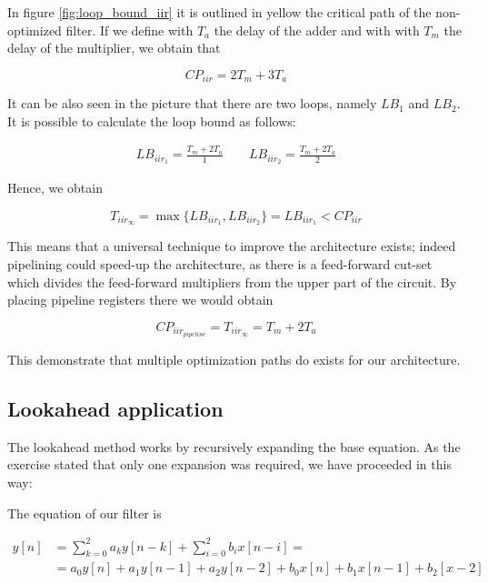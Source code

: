 In figure \ref{fig:loop_bound_iir} it is outlined in yellow the critical path of the non-optimized filter. If we define with
$T_{a}$ the delay of the adder and with with $T_{m}$ the delay of the multiplier, we obtain that

\begin{equation}
    \label{eq:baseline_iir_delay}
    CP_{iir} = 2T_{m} + 3T_{a}
\end{equation}

It can be also seen in the picture that there are two loops, namely $LB_{1}$ and $LB_{2}$. It is possible to calculate the
loop bound as follows:

\begin{align}\nonumber
    LB_{iir_{1}} = \frac{T_{m} + 2T_{a}}{1} \quad\quad LB_{iir_{2}} = \frac{T_{m} + 2T_{a}}{2}
\end{align}

Hence, we obtain

\begin{equation}\nonumber
    T_{iir_{\infty}} = \max \lbrace LB_{iir_{1}}, LB_{iir_{2}} \rbrace = LB_{iir_{1}} < CP_{iir}
\end{equation}

This means that a universal technique to improve the architecture exists; indeed pipelining could speed-up the architecture,
as there is a feed-forward cut-set which divides the feed-forward multipliers from the upper part of the circuit. By placing
pipeline registers there we would obtain

\begin{equation}
    CP_{iir_{pipeline}} = T_{iir_{\infty}} = T_{m} + 2T_{a}
\end{equation}

This demonstrate that multiple optimization paths do exists for our architecture.

\subsection{Lookahead application}

The lookahead method works by recursively expanding the base equation. As the exercise stated that only one expansion was required,
we have proceeded in this way:

The equation of our filter is

\begin{equation}
    \label{eq:iir_eq}
    \begin{split}
        y[n] &= {\sum_{k=0}^{2} a_{k}y[n-k]} + {\sum_{i=0}^{2} b_{i}x[n-i]} = \\
        &= a_{0}y[n] + a_{1}y[n-1] + a_{2}y[n-2] + b_{0}x[n] + b_{1}x[n-1] + b_2[x-2]
    \end{split}
\end{equation}

